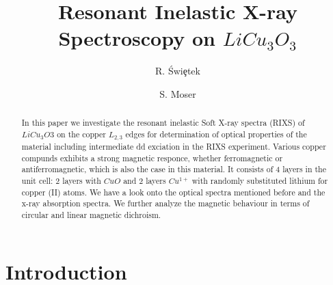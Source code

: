 \documentclass[twocolumn,amsmath,superscriptaddress,amssymb]{revtex4-1}
\begin{document}
\title{Resonant Inelastic X-ray Spectroscopy on $LiCu_3 O_3$ }
\author{ R. \'{S}wi\c{e}tek}
\author{ S. Moser}
\begin{abstract}
In this paper we investigate the resonant inelastic Soft X-ray spectra (RIXS) of $LiCu_3O3$ on the copper $ L_{2,3}$ edges for determination of optical properties of the material including intermediate dd exciation in the RIXS experiment. Various copper compunds exhibits a strong magnetic responce, whether ferromagnetic or antiferromagnetic, which is also the case in this material. It consists of 4 layers in the unit cell: 2 layers with $CuO$ and 2 layers $Cu^{1+}$ with randomly substituted lithium for copper (II) atoms. We have a look onto the optical spectra mentioned before and the x-ray absorption spectra. We further analyze the magnetic behaviour in terms of circular and linear magnetic dichroism. 
\end{abstract}
\maketitle
\section{Introduction}
\end{document}
